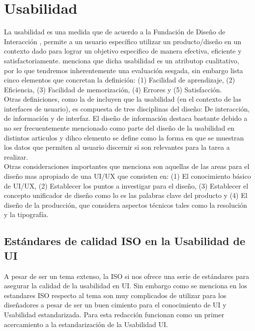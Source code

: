 \section{Usabilidad}
La usabilidad es una medida que de acuerdo a la Fundación de Diseño de Interacción \cite{unknown-author-no-dateC}, %
permite a un usuario específico utilizar un producto/diseño en un contexto dado para lograr
un objetivo especifico de manera efectiva, eficiente y satisfactoriamente. \cite{unknown-author-no-dateB} menciona %
que dicha usabilidad es un atributop cualitativo, por lo que tendremos inherentemente una
evaluación sesgada, sin embargo lista cinco elementos que concretan la definición:
(1) Facilidad de aprendizaje, (2) Eficiencia, (3) Facilidad de memorización, (4) Errores 
y (5) Satisfacción.
\\

Otras definiciones, como la de \cite{guntupalli-no-date} %
incluyen que la usabilidad (en el contexto de las interfaces de usuario),
es compuesta de tres disciplinas del diseño: De interacción, de información y de 
interfaz. El diseño de información destaca bastante debido a no ser frecuentemente mencionado como 
parte del diseño de la usabilidad en distintos articulos y dihco elemento se define como la forma en 
que se muestran los datos que permiten al usuario discernir si son relevantes para la tarea a realizar.
\\

Otras consideraciones importantes que \cite{joo-2017}  %
menciona son aquellas de las areas para el diseño mas apropiado de una UI/UX que consisten en:
(1) El conocimiento básico de UI/UX, (2) Establecer los puntos a investigar para el diseño,
(3) Establecer el concepto unificador de diseño como lo es las palabras clave del producto y
(4) El diseño de la producción, que considera aspectos técnicos tales como la resolución y la tipografía.

\subsection{Estándares de calidad ISO en la Usabilidad de UI}
A pesar de ser un tema extenso, la ISO si nos ofrece una serie de estándares para asegurar
la calidad de la usabilidad en UI. Sin embargo como se menciona en %
los estandares ISO respecto al tema son muy complicados de utilizar para los diseñadores a pesar
de ser un buen cimiento para el conocimiento de UI y Usabilidad estandarizada. Para esta redacción
funcionan como un primer acercamiento a la estandarización de la Usabilidad UI.
\\

